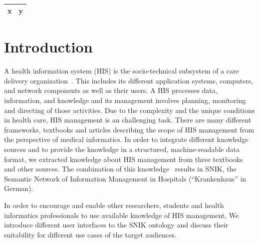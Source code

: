 \documentclass[sw]{iosart2x}
\renewcommand{\citep}{\cite}%
\begin{document}
\begin{table}
\caption{}
\label{tab:namespaces}
\begin{tabular}{ll}
\toprule
\textbf{x}	&\textbf{y}\\
\midrule
\bottomrule
\end{tabular}
\end{table}

\section{Introduction}
A health information system (HIS) is the socio-technical subsystem of a care delivery organization~\citep{bb}.
This includes its different application systems, computers, and network components as well as their users.
A HIS processes data, information, and knowledge and its management involves planning, monitoring and directing of those activities.
Due to the complexity and the unique conditions in health care, HIS management is an challenging task.
There are many different frameworks, textbooks and articles describing the scope of HIS management from the perspective of medical informatics.
In order to integrate different knowledge sources and to provide the knowledge in a structured, machine-readable data format, we extracted knowledge about HIS management from three textbooks~\citep{bb,ob,he} and other sources.
The combination of this knowledge~\citep{semantischesnetz,domaene,approachtosupport} results in SNIK, the Semantic Network of Information Management in Hospitals (\enquote{Krankenhaus} in German).

In order to encourage and enable other researchers, students and health informatics professionals to use available knowledge of HIS management, We introduce different user interfaces to the SNIK ontology and discuss their suitability for different use cases of the target audiences.
\end{document}
